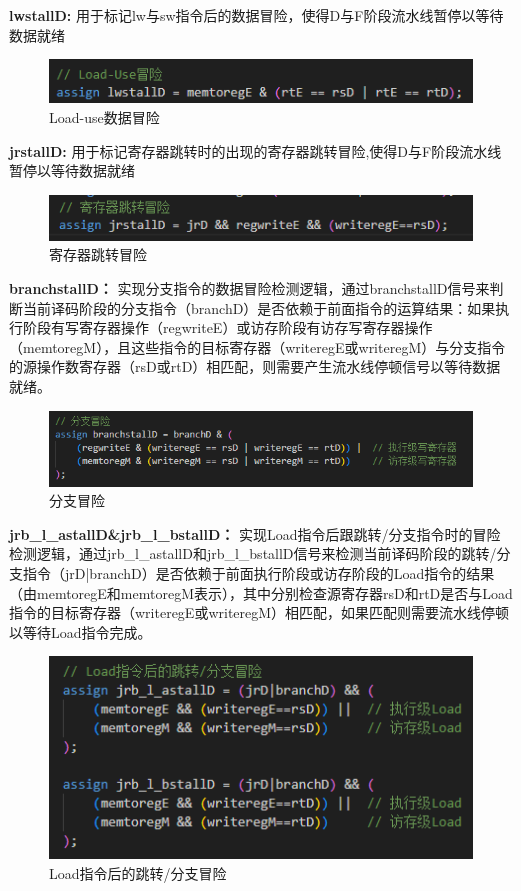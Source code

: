 \newpage
\textbf{lwstallD:}
用于标记lw与sw指令后的数据冒险，使得D与F阶段流水线暂停以等待数据就绪
\begin{figure}[h]
\centering
\includegraphics[width=1\linewidth]{image/hazard5.png}
\caption{Load-use数据冒险}
\label{fig:enter-label}
\end{figure}

\textbf{jrstallD:}
用于标记寄存器跳转时的出现的寄存器跳转冒险,使得D与F阶段流水线暂停以等待数据就绪
\begin{figure}[h]
\centering
\includegraphics[width=1\linewidth]{image/hazard6.png}
\caption{寄存器跳转冒险}
\label{fig:enter-label}
\end{figure}

\textbf{branchstallD：}
实现分支指令的数据冒险检测逻辑，通过branchstallD信号来判断当前译码阶段的分支指令（branchD）是否依赖于前面指令的运算结果：如果执行阶段有写寄存器操作（regwriteE）或访存阶段有访存写寄存器操作（memtoregM），且这些指令的目标寄存器（writeregE或writeregM）与分支指令的源操作数寄存器（rsD或rtD）相匹配，则需要产生流水线停顿信号以等待数据就绪。
\begin{figure}[h]
\centering
\includegraphics[width=1\linewidth]{image/hazard10.png}
\caption{分支冒险}
\label{fig:enter-label}
\end{figure}

\newpage
\textbf{jrb\_l\_astallD\&jrb\_l\_bstallD：}
实现Load指令后跟跳转/分支指令时的冒险检测逻辑，通过jrb\_l\_astallD和jrb\_l\_bstallD信号来检测当前译码阶段的跳转/分支指令（jrD|branchD）是否依赖于前面执行阶段或访存阶段的Load指令的结果（由memtoregE和memtoregM表示），其中分别检查源寄存器rsD和rtD是否与Load指令的目标寄存器（writeregE或writeregM）相匹配，如果匹配则需要流水线停顿以等待Load指令完成。
\begin{figure}[h]
\centering
\includegraphics[width=1\linewidth]{image/hazard7.png}
\caption{Load指令后的跳转/分支冒险}
\label{fig:enter-label}
\end{figure}

